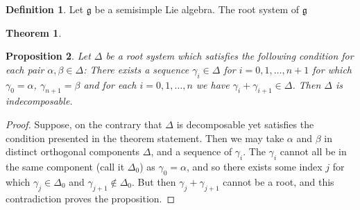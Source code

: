 \documentclass[12pt]{article}
\theoremstyle{plain}
\newtheorem{thm}{Theorem}[section]
\newtheorem{prop}[thm]{Proposition}
\theoremstyle{definition}
\newtheorem{defn}{Definition}[section]
\numberwithin{equation}{section}
\newcommand{\al}{\alpha}
\newcommand{\D}{\Delta}
\newcommand{\g}{\mathfrak{g}}
\begin{document}
\begin{defn}
Let $\g$ be a semisimple Lie algebra. The root system of $\g$
\end{defn}


\begin{thm}

\end{thm}



\begin{prop}
Let $\D$ be a root system which satisfies the following condition for each pair $\al, \beta \in \D$: There exists a sequence $\gamma_i \in \D$ for $i = 0, 1, \ldots, n+1$ for which $\gamma_0 = \al$, $\gamma_{n+1} = \beta$ and for each $i = 0, 1, \ldots, n$ we have $\gamma_i + \gamma_{i+1} \in \D$. Then $\D$ is indecomposable.
\end{prop}

\begin{proof}
Suppose, on the contrary that $\D$ is decomposable yet satisfies the condition presented in the theorem statement. Then we may take $\al$ and $\beta$ in distinct orthogonal components $\D$, and a sequence of $\gamma_i$. The $\gamma_i$ cannot all be in the same component (call it $\D_0$) as $\gamma_0 = \al$, and so there exists some index $j$ for which $\gamma_j \in \D_0$ and $\gamma_{j+1} \notin \D_0$. But then $\gamma_j + \gamma_{j+1}$ cannot be a root, and this contradiction proves the proposition.
\end{proof}
\end{document}
